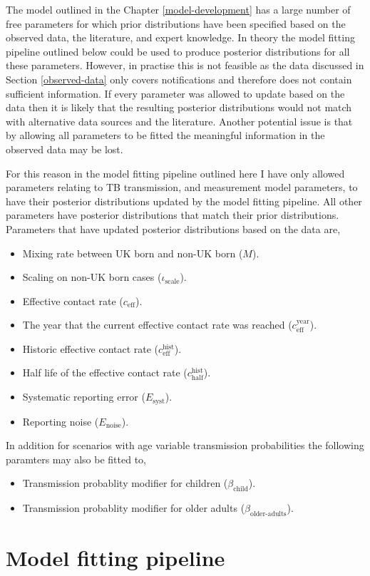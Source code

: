 \documentclass[11pt,twoside]{bristolthesis}
\providecommand{\tightlist}{%
  \setlength{\itemsep}{0pt}\setlength{\parskip}{0pt}}
\begin{document}
  The model outlined in the Chapter \ref{model-development} has a large number of free parameters for which prior distributions have been specified based on the observed data, the literature, and expert knowledge. In theory the model fitting pipeline outlined below could be used to produce posterior distributions for all these parameters. However, in practise this is not feasible as the data discussed in Section \ref{observed-data} only covers notifications and therefore does not contain sufficient information. If every parameter was allowed to update based on the data then it is likely that the resulting posterior distributions would not match with alternative data sources and the literature. Another potential issue is that by allowing all parameters to be fitted the meaningful information in the observed data may be lost.
  
  For this reason in the model fitting pipeline outlined here I have only allowed parameters relating to TB transmission, and measurement model parameters, to have their posterior distributions updated by the model fitting pipeline. All other parameters have posterior distributions that match their prior distributions. Parameters that have updated posterior distributions based on the data are,
  \begin{itemize}
  \tightlist
  \item
    Mixing rate between UK born and non-UK born (\(M\)).
  \item
    Scaling on non-UK born cases (\(\iota_{\text{scale}}\)).
  \item
    Effective contact rate (\(c_{\text{eff}}\)).
  \item
    The year that the current effective contact rate was reached (\(c^{\text{year}}_{\text{eff}}\)).
  \item
    Historic effective contact rate (\(c^{\text{hist}}_{\text{eff}}\)).
  \item
    Half life of the effective contact rate (\(c^{\text{hist}}_{\text{half}}\)).
  \item
    Systematic reporting error (\(E_{\text{syst}}\)).
  \item
    Reporting noise (\(E_{\text{noise}}\)).
  \end{itemize}
  In addition for scenarios with age variable transmission probabilities the following paramters may also be fitted to,
  \begin{itemize}
  \tightlist
  \item
    Transmission probablity modifier for children (\(\beta_{\text{child}}\)).
  \item
    Transmission probablity modifier for older adults (\(\beta_{\text{older-adults}}\)).
  \end{itemize}
  \hypertarget{fitting-pipeline}{%
  \section{Model fitting pipeline}\label{fitting-pipeline}}
  
\end{document}
